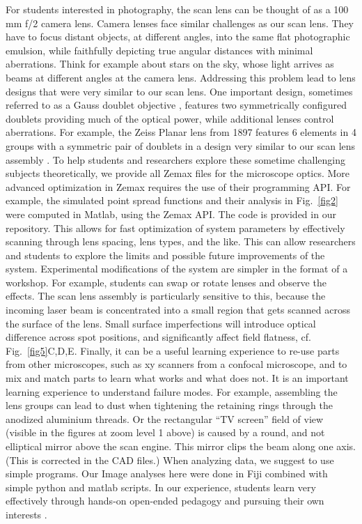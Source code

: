 \documentclass[10pt,letterpaper]{article}
\begin{document}
For students interested in photography, the scan lens can be thought of as a 100 mm f/2 camera lens. Camera lenses face similar challenges as our scan lens. They have to focus distant objects, at different angles, into the same flat photographic emulsion, while faithfully depicting true angular distances with minimal aberrations. Think for example about stars on the sky, whose light arrives as beams at different angles at the camera lens. Addressing this problem lead to lens designs that were very similar to our scan lens. One important design, sometimes referred to as a Gauss doublet objective \cite{Kidger2001}, features two symmetrically configured doublets providing much of the optical power, while additional lenses control aberrations. For example, the Zeiss Planar lens from 1897 features 6 elements in 4 groups with a symmetric pair of doublets in a design very similar to our scan lens assembly \cite{Rudolf1897}. To help students and researchers explore these sometime challenging subjects theoretically, we provide all Zemax files for the microscope optics. More advanced optimization in Zemax requires the use of their programming API. For example, the simulated point spread functions and their analysis in Fig.~\ref{fig2} were computed in Matlab, using the Zemax API. The code is provided in our repository. This allows for fast optimization of system parameters by effectively scanning through lens spacing, lens types, and the like. This can allow researchers and students to explore the limits and possible future improvements of the system. Experimental modifications of the system are simpler in the format of a workshop. For example, students can swap or rotate lenses and observe the effects. The scan lens assembly is particularly sensitive to this, because the incoming laser beam is concentrated into a small region that gets scanned across the surface of the lens. Small surface imperfections will introduce optical difference across spot positions, and significantly affect field flatness, cf. Fig.~\ref{fig5}C,D,E.\newline
Finally, it can be a useful learning experience to re-use parts from other microscopes, such as xy scanners from a confocal microscope\cite{Nikolenko2013}, and to mix and match parts to learn what works and what does not. It is an important learning experience to understand failure modes. For example, assembling the lens groups can lead to dust when tightening the retaining rings through the anodized aluminium threads. Or the rectangular ``TV screen'' field of view (visible in the figures at zoom level 1 above) is caused by a round, and not elliptical mirror above the scan engine. This mirror clips the beam along one axis. (This is corrected in the CAD files.) When analyzing data, we suggest to use simple programs. Our Image analyses here were done in Fiji \cite{Schindelin2019} combined with simple python and matlab scripts. In our experience, students learn very effectively through hands-on open-ended pedagogy and pursuing their own interests \cite{Zajdel2016}.\newline
\end{document}
